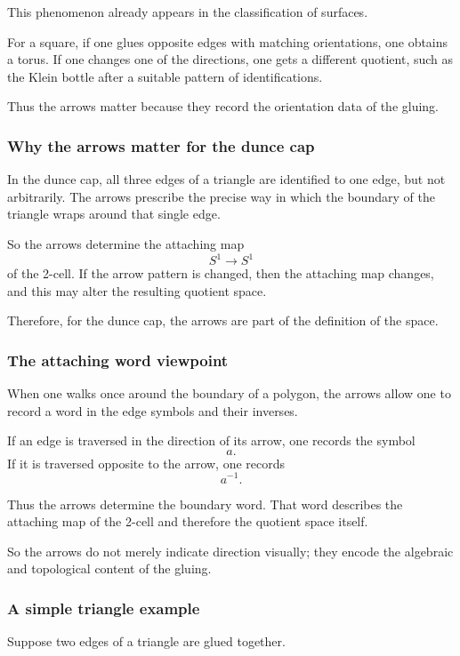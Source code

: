 \documentclass[12pt,a4paper]{article}
\theoremstyle{notespace}
\begin{document}
This phenomenon already appears in the classification of surfaces.

For a square, if one glues opposite edges with matching orientations, one obtains a torus. If one changes one of the directions, one gets a different quotient, such as the Klein bottle after a suitable pattern of identifications.

Thus the arrows matter because they record the orientation data of the gluing.

\subsubsection{Why the arrows matter for the dunce cap}

In the dunce cap, all three edges of a triangle are identified to one edge, but not arbitrarily. The arrows prescribe the precise way in which the boundary of the triangle wraps around that single edge.

So the arrows determine the attaching map
\[
S^1\to S^1
\]
of the 2-cell. If the arrow pattern is changed, then the attaching map changes, and this may alter the resulting quotient space.

Therefore, for the dunce cap, the arrows are part of the definition of the space.

\subsubsection{The attaching word viewpoint}

When one walks once around the boundary of a polygon, the arrows allow one to record a word in the edge symbols and their inverses.

If an edge is traversed in the direction of its arrow, one records the symbol
\[
a.
\]
If it is traversed opposite to the arrow, one records
\[
a^{-1}.
\]

Thus the arrows determine the boundary word. That word describes the attaching map of the 2-cell and therefore the quotient space itself.

So the arrows do not merely indicate direction visually; they encode the algebraic and topological content of the gluing.

\subsubsection{A simple triangle example}

Suppose two edges of a triangle are glued together.
\end{document}
